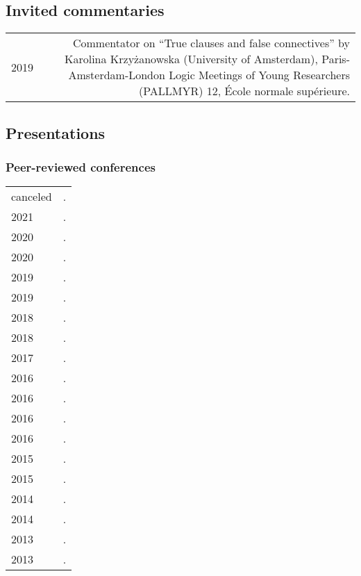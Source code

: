 \documentclass[12pt,letterpaper,twoside]{article}
\makeatletter
\newenvironment{cvsection}{%
  \begin{longtable}[l]{@{}L@{} @{}R@{}}
}{%
  \end{longtable}
}
\makeatother
\begin{document}
\subsection*{Invited commentaries}

\begin{cvsection}
  2019 & Commentator on ``True clauses and false connectives'' by Karolina Krzyżanowska (University of Amsterdam), Paris-Amsterdam-London Logic Meetings of Young Researchers (PALLMYR) 12, École normale supérieure.\\
\end{cvsection}

\subsection*{Presentations}

\subsubsection*{Peer-reviewed conferences}

\begin{cvsection}
  canceled & .\\
  2021 & .\\
  2020 & .\\
  2020 & .\\
  2019 & .\\
  2019 & .\\
  2018 & .\\
  2018 & .\\
  2017 & .\\
  2016 & .\\
  2016 & .\\
  2016 & .\\
  2016 & .\\
  2015 & .\\
  2015 & .\\
  2014 & .\\
  2014 & .\\
  2013 & .\\
  2013 & .\\
\end{cvsection}
\end{document}
